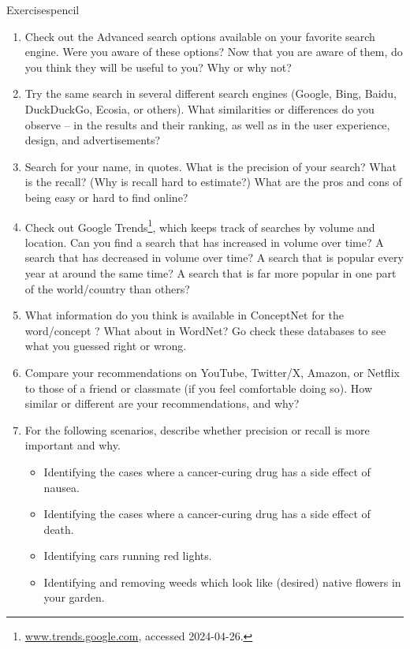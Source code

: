 \begin{tblsfilledsymbol}{Exercises}{pencil}
\begin{enumerate}
\item  Check out the Advanced search options available on your favorite search engine.  Were you aware of these options?  Now that you are aware of them, do you think they will be useful to you?  Why or why not?

\item  Try the same search in several different search engines (Google, Bing, Baidu, DuckDuckGo, Ecosia, or others).  What similarities or differences do you observe -- in the results and their ranking, as well as in the user experience, design, and advertisements?

\item  Search for your name, in quotes.  What is the precision of your search?  What is the recall?  (Why is recall hard to estimate?) What are the pros and cons of being easy or hard to find online?

\item  Check out Google Trends\footnote{\url{www.trends.google.com}, accessed 2024-04-26.}, which keeps track of searches by volume and location.  Can you find a search that has increased in volume over time?  A search that has decreased in volume over time?  A search that is popular every year at around the same time?   A search that is far more popular in one part of the world/country than others?

\item  What information do you think is available in ConceptNet for the word/concept ?   What about in WordNet?  Go check these databases to see what you guessed right or wrong.

\item  Compare your recommendations on YouTube, Twitter/X, Amazon, or Netflix to those of a friend or classmate (if you feel comfortable doing so).  How similar or different are your recommendations, and why?

\item  For the following scenarios, describe whether
  precision or recall is more important and why.
  \begin{itemize}
  \item Identifying the cases where a cancer-curing drug has a side
    effect of nausea.
  \item Identifying the cases where a cancer-curing drug has a side
    effect of death.
  \item Identifying cars running red lights.
  \item Identifying and removing weeds which look like (desired)
    native flowers in your garden.
  \end{itemize}


\end{enumerate}
\end{tblsfilledsymbol}
